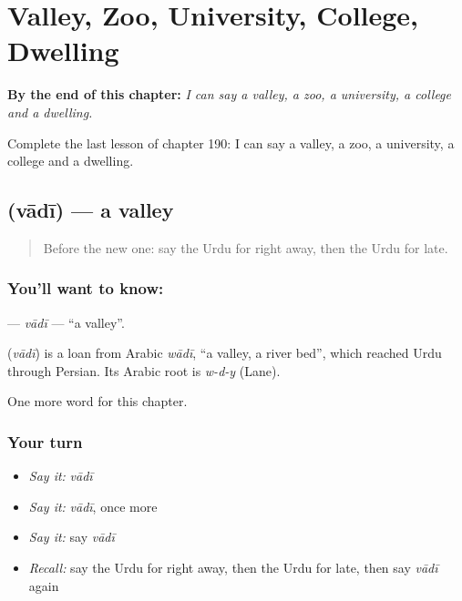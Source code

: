 
\chapter{Valley, Zoo, University, College, Dwelling}
\label{ch:ur-valley-zoo-university-college-dwelling}

\begin{chapteropening}
\textbf{By the end of this chapter:} \emph{I can say a valley, a zoo, a university, a college and a dwelling.}

Complete the last lesson of chapter 190: I can say a valley, a zoo, a university, a college and a dwelling.
\end{chapteropening}

\section[\texorpdfstring{\ur{وادی} (vādī)}{وادی (vādī)}]{ (vādī) — a valley}

\label{lesson:UR-C190-vadi}



\begin{quote}
Before the new one: say the Urdu for right away, then the Urdu for late.
\end{quote}

\subsection*{You'll want to know: }
\textbf{} — \emph{vādī} — \textquotedblleft{}a valley\textquotedblright{}.

\begin{cousinweb}
\textbf{} (\emph{vādī}) is a loan from Arabic \emph{wādī}, \textquotedblleft{}a valley, a river bed\textquotedblright{}, which reached Urdu through Persian. Its Arabic root is \emph{w-d-y} (Lane).
\end{cousinweb}

\begin{grammarlens}[title={What you've built}]
One more word for this chapter.
\end{grammarlens}

\subsection*{Your turn}
\begin{itemize}
\raggedright
  \item \emph{Say it:} \emph{vādī}
  \item \emph{Say it:} \emph{vādī}, once more
  \item \emph{Say it:} say \emph{vādī}
  \item \emph{Recall:} say the Urdu for right away, then the Urdu for late, then say \emph{vādī} again
\end{itemize}

